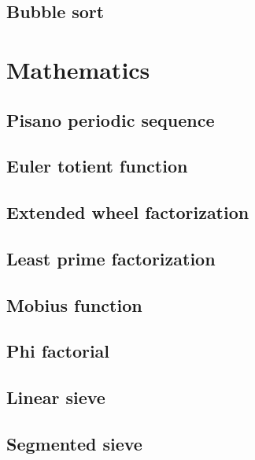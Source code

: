 \subsection{Bubble sort}
\raggedbottom
\hrulefill


\section{Mathematics}
\subsection{Pisano periodic sequence}
\raggedbottom
\hrulefill
\subsection{Euler totient function}
\raggedbottom
\hrulefill
\subsection{Extended wheel factorization}
\raggedbottom
\hrulefill
\subsection{Least prime factorization}
\raggedbottom
\hrulefill
\subsection{Mobius function}
\raggedbottom
\hrulefill
\subsection{Phi factorial}
\raggedbottom
\hrulefill
\subsection{Linear sieve}
\raggedbottom
\hrulefill
\subsection{Segmented sieve}
\raggedbottom
\hrulefill
